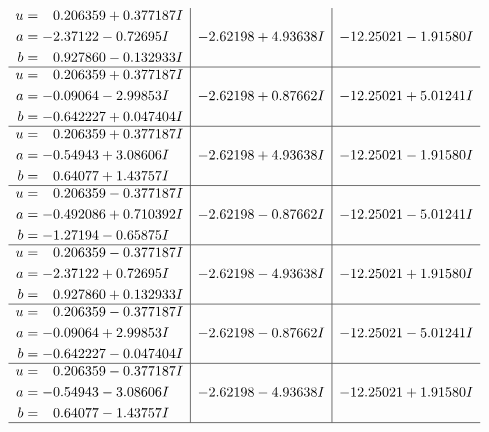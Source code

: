 \documentclass[1p]{elsarticle_modified}
\theoremstyle{definition}
\begin{document}
$$\begin{array}{c|c|c}
\begin{aligned}
u &= \phantom{-}0.206359 + 0.377187 I \\
a &= -2.37122 - 0.72695 I \\
b &= \phantom{-}0.927860 - 0.132933 I\end{aligned}
 & -2.62198 + 4.93638 I & -12.25021 - 1.91580 I \\ \hline\begin{aligned}
u &= \phantom{-}0.206359 + 0.377187 I \\
a &= -0.09064 - 2.99853 I \\
b &= -0.642227 + 0.047404 I\end{aligned}
 & -2.62198 + 0.87662 I & -12.25021 + 5.01241 I \\ \hline\begin{aligned}
u &= \phantom{-}0.206359 + 0.377187 I \\
a &= -0.54943 + 3.08606 I \\
b &= \phantom{-}0.64077 + 1.43757 I\end{aligned}
 & -2.62198 + 4.93638 I & -12.25021 - 1.91580 I \\ \hline\begin{aligned}
u &= \phantom{-}0.206359 - 0.377187 I \\
a &= -0.492086 + 0.710392 I \\
b &= -1.27194 - 0.65875 I\end{aligned}
 & -2.62198 - 0.87662 I & -12.25021 - 5.01241 I \\ \hline\begin{aligned}
u &= \phantom{-}0.206359 - 0.377187 I \\
a &= -2.37122 + 0.72695 I \\
b &= \phantom{-}0.927860 + 0.132933 I\end{aligned}
 & -2.62198 - 4.93638 I & -12.25021 + 1.91580 I \\ \hline\begin{aligned}
u &= \phantom{-}0.206359 - 0.377187 I \\
a &= -0.09064 + 2.99853 I \\
b &= -0.642227 - 0.047404 I\end{aligned}
 & -2.62198 - 0.87662 I & -12.25021 - 5.01241 I \\ \hline\begin{aligned}
u &= \phantom{-}0.206359 - 0.377187 I \\
a &= -0.54943 - 3.08606 I \\
b &= \phantom{-}0.64077 - 1.43757 I\end{aligned}
 & -2.62198 - 4.93638 I & -12.25021 + 1.91580 I\\
 \hline 
 \end{array}$$\newpage\newpage\renewcommand{\arraystretch}{1}
\end{document}
